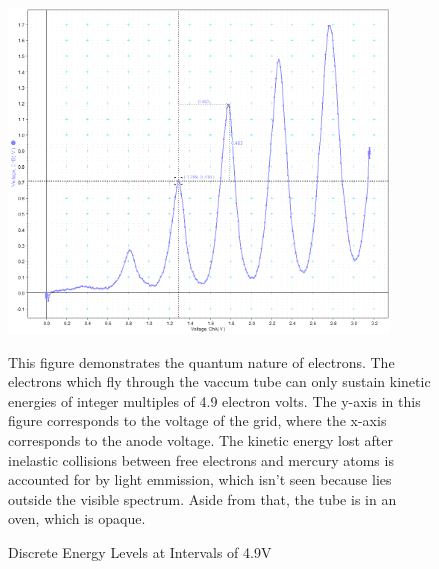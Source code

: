 \documentclass{amsart}
\begin{document}
\begin{figure}[H]
    \begin{minipage}{0.65\textwidth}
        \centering
        \includegraphics[width=0.9\textwidth]{graph.png}
        \caption{Discrete Energy Levels at Intervals of 4.9V}
    \end{minipage}
    \begin{minipage}{0.3\textwidth}
        This figure demonstrates the quantum nature of electrons. The electrons which fly through the vaccum tube can only sustain kinetic energies of integer multiples of 4.9 electron volts. The y-axis in this figure corresponds to the voltage of the grid, where the x-axis corresponds to the anode voltage. The kinetic energy lost after inelastic collisions between free electrons and mercury atoms is accounted for by light emmission, which isn't seen because lies outside the visible spectrum. Aside from that, the tube is in an oven, which is opaque.
        \vspace{0.23cm}
    \end{minipage}
\end{figure}
\end{document}
